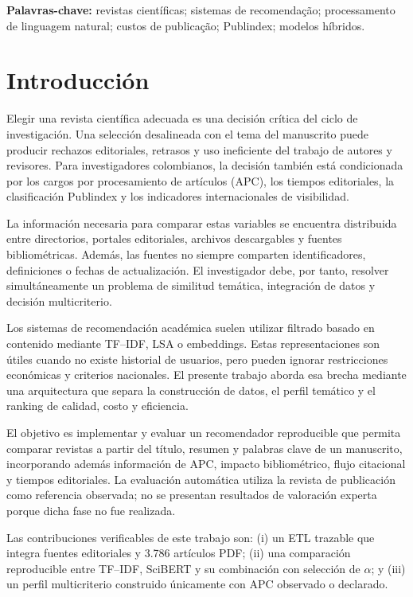 \documentclass[12pt,a4paper]{article}
\begin{document}
\textbf{Palavras-chave:} revistas científicas; sistemas de recomendação; processamento de linguagem natural; custos de publicação; Publindex; modelos híbridos.

\section{Introducción}
Elegir una revista científica adecuada es una decisión crítica del ciclo de investigación. Una selección desalineada con el tema del manuscrito puede producir rechazos editoriales, retrasos y uso ineficiente del trabajo de autores y revisores. Para investigadores colombianos, la decisión también está condicionada por los cargos por procesamiento de artículos (APC), los tiempos editoriales, la clasificación Publindex y los indicadores internacionales de visibilidad.

La información necesaria para comparar estas variables se encuentra distribuida entre directorios, portales editoriales, archivos descargables y fuentes bibliométricas. Además, las fuentes no siempre comparten identificadores, definiciones o fechas de actualización. El investigador debe, por tanto, resolver simultáneamente un problema de similitud temática, integración de datos y decisión multicriterio.

Los sistemas de recomendación académica suelen utilizar filtrado basado en contenido mediante TF--IDF, LSA o embeddings. Estas representaciones son útiles cuando no existe historial de usuarios, pero pueden ignorar restricciones económicas y criterios nacionales. El presente trabajo aborda esa brecha mediante una arquitectura que separa la construcción de datos, el perfil temático y el ranking de calidad, costo y eficiencia.

El objetivo es implementar y evaluar un recomendador reproducible que permita comparar revistas a partir del título, resumen y palabras clave de un manuscrito, incorporando además información de APC, impacto bibliométrico, flujo citacional y tiempos editoriales. La evaluación automática utiliza la revista de publicación como referencia observada; no se presentan resultados de valoración experta porque dicha fase no fue realizada.

Las contribuciones verificables de este trabajo son: (i) un ETL trazable que integra fuentes editoriales y 3.786 artículos PDF; (ii) una comparación reproducible entre TF--IDF, SciBERT y su combinación con selección de $\alpha$; y (iii) un perfil multicriterio construido únicamente con APC observado o declarado.
\end{document}

